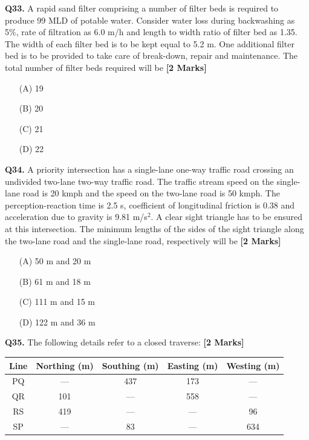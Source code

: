 \documentclass[11pt]{article}
\newcommand{\questionb}[2]{
    \noindent\textbf{Q#2.} #1 \hfill \textbf{[2 Marks]}
}
\begin{document}
\questionb{A rapid sand filter comprising a number of filter beds is required to produce 99 MLD of potable water. Consider water loss during backwashing as 5\%, rate of filtration as 6.0 m/h and length to width ratio of filter bed as 1.35. The width of each filter bed is to be kept equal to 5.2 m. One additional filter bed is to be provided to take care of break-down, repair and maintenance. The total number of filter beds required will be}{33}
\begin{enumerate}
    \item[(A)] 19
    \item[(B)] 20
    \item[(C)] 21
    \item[(D)] 22
\end{enumerate}
\vspace{0.5cm}

\questionb{A priority intersection has a single-lane one-way traffic road crossing an undivided two-lane two-way traffic road. The traffic stream speed on the single-lane road is 20 kmph and the speed on the two-lane road is 50 kmph. The perception-reaction time is 2.5 s, coefficient of longitudinal friction is 0.38 and acceleration due to gravity is 9.81 m/s\(^2\). A clear sight triangle has to be ensured at this intersection. The minimum lengths of the sides of the sight triangle along the two-lane road and the single-lane road, respectively will be}{34}
\begin{enumerate}
    \item[(A)] 50 m and 20 m
    \item[(B)] 61 m and 18 m
    \item[(C)] 111 m and 15 m
    \item[(D)] 122 m and 36 m
\end{enumerate}
\vspace{0.5cm}

\questionb{The following details refer to a closed traverse:}{35}

\begin{tabular}{|c|c|c|c|c|}
\hline
Line & Northing (m) & Southing (m) & Easting (m) & Westing (m) \\
\hline
PQ & --- & 437 & 173 & --- \\
QR & 101 & --- & 558 & --- \\
RS & 419 & --- & --- & 96 \\
SP & --- & 83 & --- & 634 \\
\hline
\end{tabular}
\end{document}

